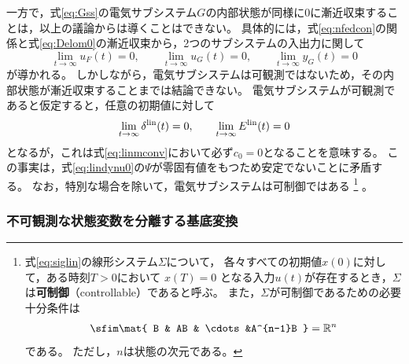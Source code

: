 \documentclass[tombow,dvipdfmx]{corona-a5-1.1}
\begin{document}
一方で，式\ref{eq:Gss}の電気サブシステム$G$の内部状態が同様に0に漸近収束することは，以上の議論からは導くことはできない。
具体的には，式\ref{eq:nfedcon}の関係と式\ref{eq:Delom0}の漸近収束から，2つのサブシステムの入出力に関して
\[
\lim_{t\rightarrow \infty} u_F(t)  =0,\qquad
\lim_{t\rightarrow \infty} u_G(t)  =0,\qquad
\lim_{t\rightarrow \infty} y_G(t)  =0
\]
が導かれる。
しかしながら，電気サブシステムは可観測ではないため，その内部状態が漸近収束することまでは結論できない。
電気サブシステムが可観測であると仮定すると，任意の初期値に対して
\[
\lim_{t\rightarrow \infty}  \delta^{\rm lin}(t)  =0,\qquad
\lim_{t\rightarrow \infty}  E^{\rm lin}(t)  =0
\]
となるが，これは式\ref{eq:linmconv}において必ず$c_0=0$となることを意味する。
この事実は，式\ref{eq:lindynu0}の$\Psi$が零固有値をもつため安定でないことに矛盾する。
なお，特別な場合を除いて，電気サブシステムは可制御ではある
\footnote{
式\ref{eq:siglin}の線形システム$\Sigma$について，
各々すべての初期値$x(0)$に対して，ある時刻$T > 0$において $x(T) = 0$ となる入力$u(t)$が存在するとき，$\Sigma$は\textbf{可制御}（controllable）であると呼ぶ。
また，$\Sigma$が可制御であるための必要十分条件は
\[
\sfim \mat{
B & AB & \cdots &A^{n-1}B
}
= \mathbb{R}^n
\]
である。
ただし，$n$は状態の次元である。
}
。

\begin{例}[近似線形モデルの運動エネルギーとポテンシャルエネルギー]
\end{例}

\subsubsection{不可観測な状態変数を分離する基底変換}
\end{document}
